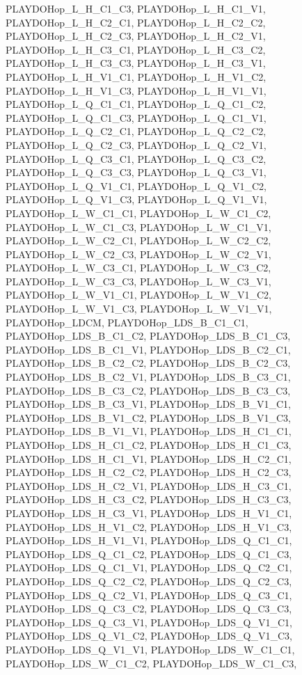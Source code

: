 PLAYDOHop\_\-L\_\-H\_\-C1\_\-C3, PLAYDOHop\_\-L\_\-H\_\-C1\_\-V1, PLAYDOHop\_\-L\_\-H\_\-C2\_\-C1, PLAYDOHop\_\-L\_\-H\_\-C2\_\-C2, PLAYDOHop\_\-L\_\-H\_\-C2\_\-C3, PLAYDOHop\_\-L\_\-H\_\-C2\_\-V1, PLAYDOHop\_\-L\_\-H\_\-C3\_\-C1, PLAYDOHop\_\-L\_\-H\_\-C3\_\-C2, PLAYDOHop\_\-L\_\-H\_\-C3\_\-C3, PLAYDOHop\_\-L\_\-H\_\-C3\_\-V1, PLAYDOHop\_\-L\_\-H\_\-V1\_\-C1, PLAYDOHop\_\-L\_\-H\_\-V1\_\-C2, PLAYDOHop\_\-L\_\-H\_\-V1\_\-C3, PLAYDOHop\_\-L\_\-H\_\-V1\_\-V1, PLAYDOHop\_\-L\_\-Q\_\-C1\_\-C1, PLAYDOHop\_\-L\_\-Q\_\-C1\_\-C2, PLAYDOHop\_\-L\_\-Q\_\-C1\_\-C3, PLAYDOHop\_\-L\_\-Q\_\-C1\_\-V1, PLAYDOHop\_\-L\_\-Q\_\-C2\_\-C1, PLAYDOHop\_\-L\_\-Q\_\-C2\_\-C2, PLAYDOHop\_\-L\_\-Q\_\-C2\_\-C3, PLAYDOHop\_\-L\_\-Q\_\-C2\_\-V1, PLAYDOHop\_\-L\_\-Q\_\-C3\_\-C1, PLAYDOHop\_\-L\_\-Q\_\-C3\_\-C2, PLAYDOHop\_\-L\_\-Q\_\-C3\_\-C3, PLAYDOHop\_\-L\_\-Q\_\-C3\_\-V1, PLAYDOHop\_\-L\_\-Q\_\-V1\_\-C1, PLAYDOHop\_\-L\_\-Q\_\-V1\_\-C2, PLAYDOHop\_\-L\_\-Q\_\-V1\_\-C3, PLAYDOHop\_\-L\_\-Q\_\-V1\_\-V1, PLAYDOHop\_\-L\_\-W\_\-C1\_\-C1, PLAYDOHop\_\-L\_\-W\_\-C1\_\-C2, PLAYDOHop\_\-L\_\-W\_\-C1\_\-C3, PLAYDOHop\_\-L\_\-W\_\-C1\_\-V1, PLAYDOHop\_\-L\_\-W\_\-C2\_\-C1, PLAYDOHop\_\-L\_\-W\_\-C2\_\-C2, PLAYDOHop\_\-L\_\-W\_\-C2\_\-C3, PLAYDOHop\_\-L\_\-W\_\-C2\_\-V1, PLAYDOHop\_\-L\_\-W\_\-C3\_\-C1, PLAYDOHop\_\-L\_\-W\_\-C3\_\-C2, PLAYDOHop\_\-L\_\-W\_\-C3\_\-C3, PLAYDOHop\_\-L\_\-W\_\-C3\_\-V1, PLAYDOHop\_\-L\_\-W\_\-V1\_\-C1, PLAYDOHop\_\-L\_\-W\_\-V1\_\-C2, PLAYDOHop\_\-L\_\-W\_\-V1\_\-C3, PLAYDOHop\_\-L\_\-W\_\-V1\_\-V1, PLAYDOHop\_\-LDCM, PLAYDOHop\_\-LDS\_\-B\_\-C1\_\-C1, PLAYDOHop\_\-LDS\_\-B\_\-C1\_\-C2, PLAYDOHop\_\-LDS\_\-B\_\-C1\_\-C3, PLAYDOHop\_\-LDS\_\-B\_\-C1\_\-V1, PLAYDOHop\_\-LDS\_\-B\_\-C2\_\-C1, PLAYDOHop\_\-LDS\_\-B\_\-C2\_\-C2, PLAYDOHop\_\-LDS\_\-B\_\-C2\_\-C3, PLAYDOHop\_\-LDS\_\-B\_\-C2\_\-V1, PLAYDOHop\_\-LDS\_\-B\_\-C3\_\-C1, PLAYDOHop\_\-LDS\_\-B\_\-C3\_\-C2, PLAYDOHop\_\-LDS\_\-B\_\-C3\_\-C3, PLAYDOHop\_\-LDS\_\-B\_\-C3\_\-V1, PLAYDOHop\_\-LDS\_\-B\_\-V1\_\-C1, PLAYDOHop\_\-LDS\_\-B\_\-V1\_\-C2, PLAYDOHop\_\-LDS\_\-B\_\-V1\_\-C3, PLAYDOHop\_\-LDS\_\-B\_\-V1\_\-V1, PLAYDOHop\_\-LDS\_\-H\_\-C1\_\-C1, PLAYDOHop\_\-LDS\_\-H\_\-C1\_\-C2, PLAYDOHop\_\-LDS\_\-H\_\-C1\_\-C3, PLAYDOHop\_\-LDS\_\-H\_\-C1\_\-V1, PLAYDOHop\_\-LDS\_\-H\_\-C2\_\-C1, PLAYDOHop\_\-LDS\_\-H\_\-C2\_\-C2, PLAYDOHop\_\-LDS\_\-H\_\-C2\_\-C3, PLAYDOHop\_\-LDS\_\-H\_\-C2\_\-V1, PLAYDOHop\_\-LDS\_\-H\_\-C3\_\-C1, PLAYDOHop\_\-LDS\_\-H\_\-C3\_\-C2, PLAYDOHop\_\-LDS\_\-H\_\-C3\_\-C3, PLAYDOHop\_\-LDS\_\-H\_\-C3\_\-V1, PLAYDOHop\_\-LDS\_\-H\_\-V1\_\-C1, PLAYDOHop\_\-LDS\_\-H\_\-V1\_\-C2, PLAYDOHop\_\-LDS\_\-H\_\-V1\_\-C3, PLAYDOHop\_\-LDS\_\-H\_\-V1\_\-V1, PLAYDOHop\_\-LDS\_\-Q\_\-C1\_\-C1, PLAYDOHop\_\-LDS\_\-Q\_\-C1\_\-C2, PLAYDOHop\_\-LDS\_\-Q\_\-C1\_\-C3, PLAYDOHop\_\-LDS\_\-Q\_\-C1\_\-V1, PLAYDOHop\_\-LDS\_\-Q\_\-C2\_\-C1, PLAYDOHop\_\-LDS\_\-Q\_\-C2\_\-C2, PLAYDOHop\_\-LDS\_\-Q\_\-C2\_\-C3, PLAYDOHop\_\-LDS\_\-Q\_\-C2\_\-V1, PLAYDOHop\_\-LDS\_\-Q\_\-C3\_\-C1, PLAYDOHop\_\-LDS\_\-Q\_\-C3\_\-C2, PLAYDOHop\_\-LDS\_\-Q\_\-C3\_\-C3, PLAYDOHop\_\-LDS\_\-Q\_\-C3\_\-V1, PLAYDOHop\_\-LDS\_\-Q\_\-V1\_\-C1, PLAYDOHop\_\-LDS\_\-Q\_\-V1\_\-C2, PLAYDOHop\_\-LDS\_\-Q\_\-V1\_\-C3, PLAYDOHop\_\-LDS\_\-Q\_\-V1\_\-V1, PLAYDOHop\_\-LDS\_\-W\_\-C1\_\-C1, PLAYDOHop\_\-LDS\_\-W\_\-C1\_\-C2, PLAYDOHop\_\-LDS\_\-W\_\-C1\_\-C3, 